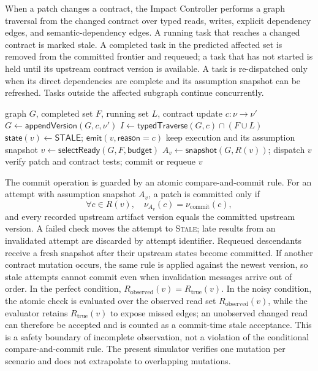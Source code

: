 \documentclass[a4paper,runningheads]{llncs}
\begin{document}
When a patch changes a contract, the Impact Controller performs a graph traversal from the changed contract over typed reads, writes, explicit dependency edges, and semantic-dependency edges. A running task that reaches a changed contract is marked stale. A completed task in the predicted affected set is removed from the committed frontier and requeued; a task that has not started is held until its upstream contract version is available. A task is re-dispatched only when its direct dependencies are complete and its assumption snapshot can be refreshed. Tasks outside the affected subgraph continue concurrently.

\begin{algorithm}
\caption{Selective invalidation and re-dispatch}
\label{alg:semkg}
\begin{algorithmic}[1]
\Require graph $G$, completed set $F$, running set $L$, contract update $c:\nu\rightarrow\nu'$
\State $G\leftarrow\mathsf{appendVersion}(G,c,\nu')$
\State $I\leftarrow\mathsf{typedTraverse}(G,c)\cap (F\cup L)$
  \State $\mathsf{state}(v)\leftarrow\mathsf{STALE}$; $\mathsf{emit}(v,\mathsf{reason}=c)$
\EndFor
{}
  \State keep execution and its assumption snapshot
\EndFor
{}
  \State $v\leftarrow\mathsf{selectReady}(G,F,\mathsf{budget})$
  \State $A_v\leftarrow\mathsf{snapshot}(G,R(v))$; dispatch $v$
  \State verify patch and contract tests; commit or requeue $v$
\EndWhile
\end{algorithmic}
\end{algorithm}

The commit operation is guarded by an atomic compare-and-commit rule. For an attempt with assumption snapshot $A_v$, a patch is committed only if
\[
\forall c\in R(v),\quad \nu_{A_v}(c)=\nu_{\mathrm{commit}}(c),
\]
and every recorded upstream artifact version equals the committed upstream version. A failed check moves the attempt to \textsc{Stale}; late results from an invalidated attempt are discarded by attempt identifier. Requeued descendants receive a fresh snapshot after their upstream states become committed. If another contract mutation occurs, the same rule is applied against the newest version, so stale attempts cannot commit even when invalidation messages arrive out of order. In the perfect condition, $R_{\mathrm{observed}}(v)=R_{\mathrm{true}}(v)$. In the noisy condition, the atomic check is evaluated over the observed read set $R_{\mathrm{observed}}(v)$, while the evaluator retains $R_{\mathrm{true}}(v)$ to expose missed edges; an unobserved changed read can therefore be accepted and is counted as a commit-time stale acceptance. This is a safety boundary of incomplete observation, not a violation of the conditional compare-and-commit rule. The present simulator verifies one mutation per scenario and does not extrapolate to overlapping mutations.
\end{document}
